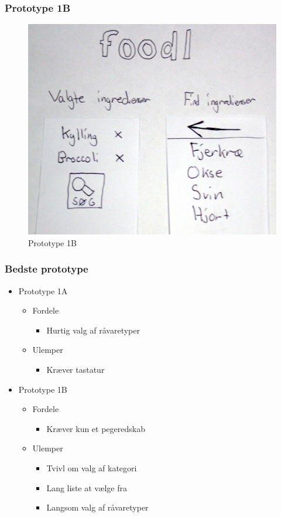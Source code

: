 \begin{frame}
	\frametitle{Prototype 1B}
	\begin{figure}
	\centering
	\includegraphics[scale=0.08]{billeder/prototype1b.jpg}
	\caption{Prototype 1B}
	\end{figure}
\end{frame}

\begin{frame}
\frametitle{Bedste prototype}
	\begin{itemize}
	\item Prototype 1A
			\begin{itemize}
			\item Fordele
				\begin{itemize}
				\item Hurtig valg af råvaretyper
				\end{itemize}
			\item Ulemper
				\begin{itemize}
				\item Kræver tastatur
				\end{itemize}
			\end{itemize}
	\item Prototype 1B
			\begin{itemize}
			\item Fordele
				\begin{itemize}
				\item Kræver kun et pegeredskab
				\end{itemize}
			\item Ulemper
				\begin{itemize}
				\item Tvivl om valg af kategori
				\item Lang liste at vælge fra
				\item Langsom valg af råvaretyper
				\end{itemize}
			\end{itemize} 
	\end{itemize}
	
\end{frame}

